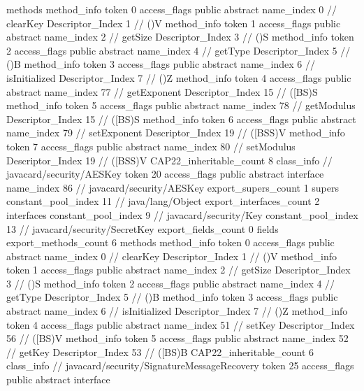 {{{			methods {
				method_info {
					token	0
					access_flags	public abstract
					name_index	0		// clearKey
					Descriptor_Index	1		// ()V
				}
				method_info {
					token	1
					access_flags	public abstract
					name_index	2		// getSize
					Descriptor_Index	3		// ()S
				}
				method_info {
					token	2
					access_flags	public abstract
					name_index	4		// getType
					Descriptor_Index	5		// ()B
				}
				method_info {
					token	3
					access_flags	public abstract
					name_index	6		// isInitialized
					Descriptor_Index	7		// ()Z
				}
				method_info {
					token	4
					access_flags	public abstract
					name_index	77		// getExponent
					Descriptor_Index	15		// ([BS)S
				}
				method_info {
					token	5
					access_flags	public abstract
					name_index	78		// getModulus
					Descriptor_Index	15		// ([BS)S
				}
				method_info {
					token	6
					access_flags	public abstract
					name_index	79		// setExponent
					Descriptor_Index	19		// ([BSS)V
				}
				method_info {
					token	7
					access_flags	public abstract
					name_index	80		// setModulus
					Descriptor_Index	19		// ([BSS)V
				}
			}
			CAP22_inheritable_count	8
		}
		class_info {		// javacard/security/AESKey
			token	20
			access_flags	public abstract interface
			name_index	86		// javacard/security/AESKey
			export_supers_count	1
			supers {
				constant_pool_index	11		// java/lang/Object
			}
			export_interfaces_count	2
			interfaces {
				constant_pool_index	9		// javacard/security/Key
				constant_pool_index	13		// javacard/security/SecretKey
			}
			export_fields_count	0
			fields {
			}
			export_methods_count	6
			methods {
				method_info {
					token	0
					access_flags	public abstract
					name_index	0		// clearKey
					Descriptor_Index	1		// ()V
				}
				method_info {
					token	1
					access_flags	public abstract
					name_index	2		// getSize
					Descriptor_Index	3		// ()S
				}
				method_info {
					token	2
					access_flags	public abstract
					name_index	4		// getType
					Descriptor_Index	5		// ()B
				}
				method_info {
					token	3
					access_flags	public abstract
					name_index	6		// isInitialized
					Descriptor_Index	7		// ()Z
				}
				method_info {
					token	4
					access_flags	public abstract
					name_index	51		// setKey
					Descriptor_Index	56		// ([BS)V
				}
				method_info {
					token	5
					access_flags	public abstract
					name_index	52		// getKey
					Descriptor_Index	53		// ([BS)B
				}
			}
			CAP22_inheritable_count	6
		}
		class_info {		// javacard/security/SignatureMessageRecovery
			token	25
			access_flags	public abstract interface
}}}
